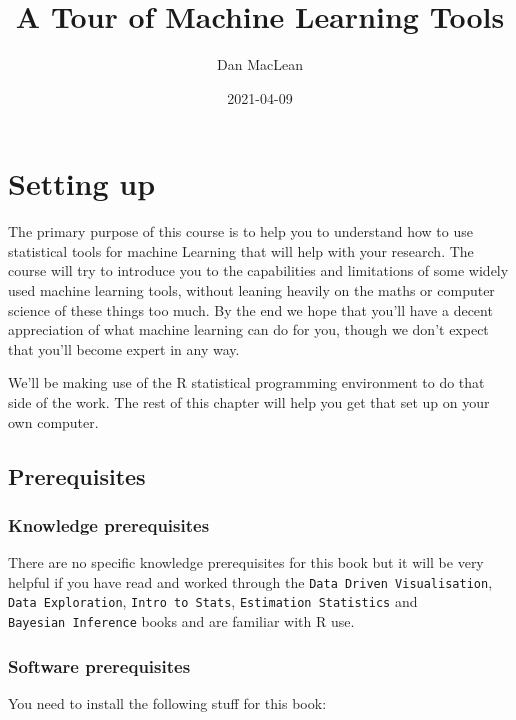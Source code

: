 \documentclass[
]{book}
\title{A Tour of Machine Learning Tools}
\author{Dan MacLean}
\date{2021-04-09}
\begin{document}
\maketitle

{
\setcounter{tocdepth}{1}
\tableofcontents
}
\hypertarget{setting-up}{%
\chapter{Setting up}\label{setting-up}}

The primary purpose of this course is to help you to understand how to use statistical tools for machine Learning that will help with your research. The course will try to introduce you to the capabilities and limitations of some widely used machine learning tools, without leaning heavily on the maths or computer science of these things too much. By the end we hope that you'll have a decent appreciation of what machine learning can do for you, though we don't expect that you'll become expert in any way.

We'll be making use of the R statistical programming environment to do that side of the work. The rest of this chapter will help you get that set up on your own computer.

\hypertarget{prerequisites}{%
\section{Prerequisites}\label{prerequisites}}

\hypertarget{knowledge-prerequisites}{%
\subsection{Knowledge prerequisites}\label{knowledge-prerequisites}}

There are no specific knowledge prerequisites for this book but it will be very helpful if you have read and worked through the \texttt{Data\ Driven\ Visualisation}, \texttt{Data\ Exploration}, \texttt{Intro\ to\ Stats}, \texttt{Estimation\ Statistics} and \texttt{Bayesian\ Inference} books and are familiar with R use.

\hypertarget{software-prerequisites}{%
\subsection{Software prerequisites}\label{software-prerequisites}}

You need to install the following stuff for this book:
\end{document}
